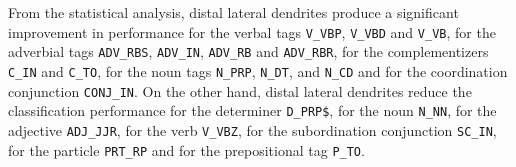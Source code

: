 {From the statistical analysis, distal lateral dendrites produce a significant improvement in performance for the verbal tags
\texttt{V\_VBP}, \texttt{V\_VBD} and \texttt{V\_VB}, for the adverbial tags \texttt{ADV\_RBS}, \texttt{ADV\_IN}, \texttt{ADV\_RB} and \texttt{ADV\_RBR}, for the complementizers  \texttt{C\_IN} and \texttt{C\_TO}, for the noun tags \texttt{N\_PRP}, \texttt{N\_DT}, and \texttt{N\_CD} and for the coordination conjunction \texttt{CONJ\_IN}.
On the other hand, distal lateral dendrites reduce the classification performance for the determiner
\texttt{D\_PRP\$}, for the noun \texttt{N\_NN}, for the adjective \texttt{ADJ\_JJR}, for the verb \texttt{V\_VBZ}, for the subordination conjunction \texttt{SC\_IN}, for the particle \texttt{PRT\_RP} and for the prepositional tag \texttt{P\_TO}.
}






























